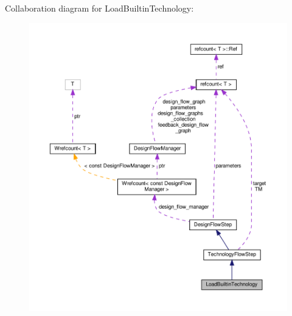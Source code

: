 Collaboration diagram for Load\+Builtin\+Technology\+:
\nopagebreak
\begin{figure}[H]
\begin{center}
\leavevmode
\includegraphics[width=350pt]{d9/d27/classLoadBuiltinTechnology__coll__graph}
\end{center}
\end{figure}
